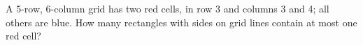 A 5-row, 6-column grid has two red cells, in row 3 and columns 3 and 4; all others are blue. How many rectangles with sides on grid lines contain at most one red cell?
